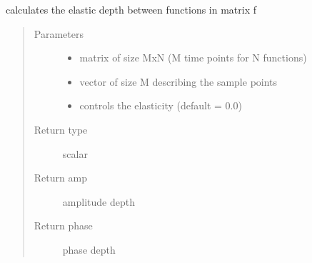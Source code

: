 \documentclass[letterpaper,10pt,english]{sphinxmanual}
\begin{document}
\begin{fulllineitems}
\label{\detokenize{utility_functions:utility_functions.elastic_depth}}
calculates the elastic depth between functions in matrix f
\begin{quote}\begin{description}
\item[{Parameters}] \leavevmode\begin{itemize}
\item {} 
 \textendash{} matrix of size MxN (M time points for N functions)

\item {} 
 \textendash{} vector of size M describing the sample points

\item {} 
 \textendash{} controls the elasticity (default = 0.0)

\end{itemize}

\item[{Return type}] \leavevmode
scalar

\item[{Return amp}] \leavevmode
amplitude depth

\item[{Return phase}] \leavevmode
phase depth

\end{description}\end{quote}

\end{fulllineitems}

\end{document}
